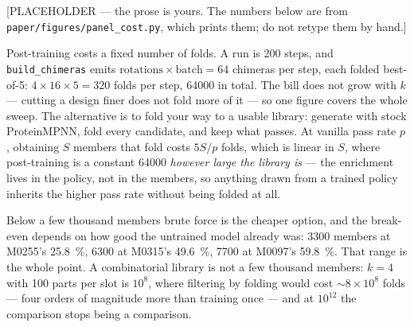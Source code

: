 \documentclass[11pt]{article}
\begin{document}
\clearpage
\noindent{}
\label{fig:concept}
\clearpage

\noindent\textcolor{cleoRed}{[PLACEHOLDER --- the prose is yours. The
numbers below are from \texttt{paper/figures/panel\_cost.py}, which prints
them; do not retype them by hand.]}

Post-training costs a fixed number of folds. A run is 200 steps, and
\texttt{build\_chimeras} emits $\text{rotations}\times\text{batch}=64$
chimeras per step, each folded best-of-5: $4\times16\times5=320$ folds per
step, \SI{64000}{} in total. The bill does not grow with $k$ --- cutting a
design finer does not fold more of it --- so one figure covers the whole
sweep. The alternative is to fold your way to a usable library: generate with
stock ProteinMPNN, fold every candidate, and keep what passes. At vanilla
pass rate $p$, obtaining $S$ members that fold costs $5S/p$ folds, which is
linear in $S$, where post-training is a constant \SI{64000}{} \emph{however
large the library is} --- the enrichment lives in the policy, not in the
members, so anything drawn from a trained policy inherits the higher pass
rate without being folded at all.

Below a few thousand members brute force is the cheaper option, and the
break-even depends on how good the untrained model already was: \SI{3300}{}
members at M0255's \SI{25.8}{\percent}, \SI{6300}{} at M0315's
\SI{49.6}{\percent}, \SI{7700}{} at M0097's \SI{59.8}{\percent}. That
range is the whole point. A combinatorial library is not a few thousand
members: $k=4$ with 100 parts per slot is $10^{8}$, where filtering by
folding would cost ${\sim}8{\times}10^{8}$ folds --- four orders of
magnitude more than training once --- and at $10^{12}$ the comparison stops
being a comparison.
\end{document}
